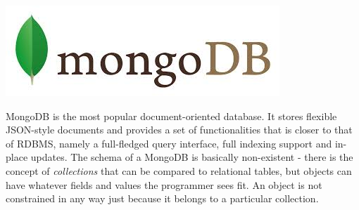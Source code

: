 \vspace{-1.15cm} \hspace{3.6cm} \includegraphics[scale=0.2]{3/figures/mongodb.jpg}

MongoDB is the most popular document-oriented database.
It stores flexible JSON-style documents and provides a set of functionalities that is closer to that of RDBMS, namely a full-fledged query interface, full indexing support and in-place updates.
The schema of a MongoDB is basically non-existent - there is the concept of \textit{collections} that can be compared to relational tables, but objects can have whatever fields and values the programmer sees fit. An object is not constrained in any way just because it belongs to a particular collection.

